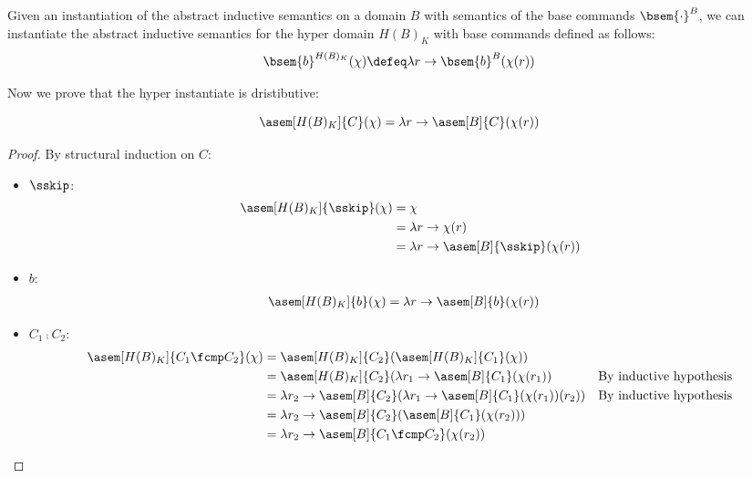\begin{definition}
  Given an instantiation of the abstract inductive semantics on a domain $B$ 
  with semantics of the base commands $\bsem{\cdot}^B$, we can instantiate the 
  abstract inductive semantics for the hyper domain $H(B)_K$ with base 
  commands defined as follows:
  $$\bsem{b}^{H(B)_K}(\chi) \defeq \lambda r \to \bsem{b}^B(\chi(r))$$
\end{definition}

Now we prove that the hyper instantiate is dristibutive:
\begin{theorem}[Distributivity]
    \label{thm:hyper-add}
    $$\asem[H(B)_K]{C}(\mathcal{\chi}) = \lambda r \to \asem[B]{C}(\chi(r))$$
\end{theorem}
\begin{proof}
  By structural induction on $C$:
  \begin{itemize}
    \item $\sskip$:
      \begin{align*}
        \asem[H(B)_K]{\sskip}(\chi) 
          &= \chi \\
          &= \lambda r \to \chi(r) \\
          &= \lambda r \to \asem[B]{\sskip}(\chi(r))
      \end{align*}

    \item $b$:
      \begin{align*}
        \asem[H(B)_K]{b}(\chi) 
          &= \lambda r \to \asem[B]{b}(\chi(r))
      \end{align*}

    \item $C_1 \fcmp C_2$:
      \begin{align*}
        \asem[H(B)_K]{C_1 \fcmp C_2}(\chi) 
          &= \asem[H(B)_K]{C_2}(\asem[H(B)_K]{C_1}(\chi)) \\
          &= \asem[H(B)_K]{C_2}(\lambda r_1 \to 
            \asem[B]{C_1}(\chi(r_1))
          &\text{By inductive hypothesis} \\
          &= \lambda r_2 \to \asem[B]{C_2}(\lambda r_1 \to 
            \asem[B]{C_1}(\chi(r_1))(r_2))
          &\text{By inductive hypothesis} \\
          &= \lambda r_2 \to 
            \asem[B]{C_2}(\asem[B]{C_1}(\chi(r_2))) \\
          &= \lambda r_2 \to \asem[B]{C_1 \fcmp C_2}(\chi(r_2)) \\
      \end{align*}


\end{itemize}
\end{proof}

